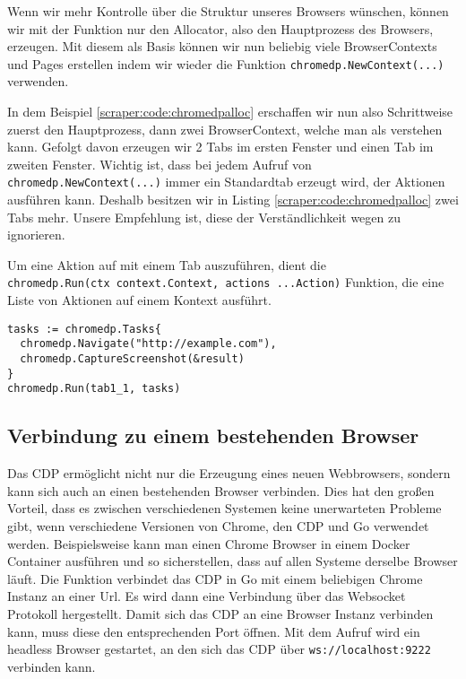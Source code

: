 
Wenn wir mehr Kontrolle über die Struktur unseres Browsers wünschen, können wir mit der Funktion  nur den Allocator, also den Hauptprozess des Browsers, erzeugen. Mit diesem als Basis können wir nun beliebig viele BrowserContexts und Pages erstellen indem wir wieder die Funktion \texttt{chromedp.NewContext(...)} verwenden. 


In dem Beispiel \ref{scraper:code:chromedpalloc} erschaffen wir nun also Schrittweise zuerst den Hauptprozess, dann zwei BrowserContext, welche man als  verstehen kann. Gefolgt davon erzeugen wir 2 Tabs im ersten Fenster und einen Tab im zweiten Fenster. Wichtig ist, dass bei jedem Aufruf von \texttt{chromedp.NewContext(...)} immer ein Standardtab erzeugt wird, der Aktionen ausführen kann. Deshalb besitzen wir in Listing \ref{scraper:code:chromedpalloc} zwei Tabs mehr. Unsere Empfehlung ist, diese der Verständlichkeit wegen zu ignorieren. 

Um eine Aktion auf mit einem Tab auszuführen, dient die \\
\texttt{chromedp.Run(ctx context.Context, actions ...Action)} Funktion, die eine Liste von Aktionen auf einem Kontext ausführt. 
\begin{verbatim}
tasks := chromedp.Tasks{
  chromedp.Navigate("http://example.com"),
  chromedp.CaptureScreenshot(&result)
}
chromedp.Run(tab1_1, tasks)
\end{verbatim}
\pagebreak
\subsection{Verbindung zu einem bestehenden Browser} \label{scraper:subsec:go:remote}
Das CDP ermöglicht nicht nur die Erzeugung eines neuen Webbrowsers, sondern kann sich auch an einen bestehenden Browser verbinden. Dies hat den großen Vorteil, dass es zwischen verschiedenen Systemen keine unerwarteten Probleme gibt, wenn verschiedene Versionen von Chrome, den CDP und Go verwendet werden. Beispielsweise kann man einen Chrome Browser in einem Docker Container ausführen und so sicherstellen, dass auf allen Systeme derselbe Browser läuft. Die Funktion  verbindet das CDP in Go mit einem beliebigen Chrome Instanz an einer Url. Es wird dann eine Verbindung über das Websocket Protokoll hergestellt. Damit sich das CDP an eine Browser Instanz verbinden kann, muss diese den entsprechenden Port öffnen. Mit dem Aufruf  wird ein headless Browser gestartet, an den sich das CDP über  \verb|ws://localhost:9222| verbinden kann.

